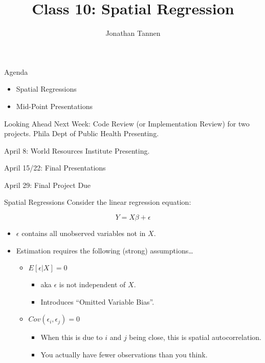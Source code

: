 \documentclass[
  8pt,
  ignorenonframetext,
]{beamer}
\title{Class 10: Spatial Regression}
\author{Jonathan Tannen}
\date{}
\providecommand{\tightlist}{%
  \setlength{\itemsep}{0pt}\setlength{\parskip}{0pt}}
\begin{document}
\frame{\titlepage}

\begin{frame}{Agenda}
\protect\hypertarget{agenda}{}
\begin{itemize}
\tightlist
\item
  Spatial Regressions
\item
  Mid-Point Presentations
\end{itemize}
\end{frame}

\begin{frame}{Looking Ahead}
\protect\hypertarget{looking-ahead}{}
Next Week: Code Review (or Implementation Review) for two projects.
Phila Dept of Public Health Presenting.

April 8: World Resources Institute Presenting.

April 15/22: Final Presentations

April 29: Final Project Due
\end{frame}

\begin{frame}{Spatial Regressions}
\protect\hypertarget{spatial-regressions}{}
Consider the linear regression equation:

\[Y = X\beta + \epsilon\] \pause

\begin{itemize}
\tightlist
\item
  \(\epsilon\) contains all unobserved variables not in \(X\).
\item
  Estimation requires the following (strong) assumptions\ldots{}

  \begin{itemize}
  \tightlist
  \item
    \(E[\epsilon | X] = 0\)

    \begin{itemize}
    \tightlist
    \item
      aka \(\epsilon\) is not independent of \(X\).
    \item
      Introduces ``Omitted Variable Bias''. \pause
    \end{itemize}
  \item
    \(Cov(\epsilon_i, \epsilon_j) = 0\)

    \begin{itemize}
    \tightlist
    \item
      When this is due to \(i\) and \(j\) being close, this is spatial
      autocorrelation.
    \item
      You actually have fewer observations than you think.
    \end{itemize}
  \end{itemize}
\end{itemize}
\end{frame}
\end{document}
